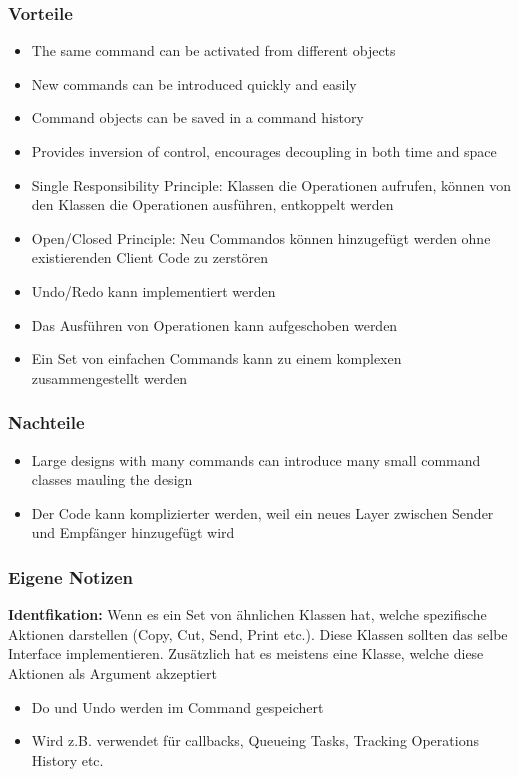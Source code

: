 \subsubsection{Vorteile}
\begin{itemize}[topsep=0pt]
    \itemsep -0.4em
    \item The same command can be activated from different objects
    \item New commands can be introduced quickly and easily
    \item Command objects can be saved in a command history
    \item Provides inversion of control, encourages decoupling in both time and space
    \item Single Responsibility Principle: Klassen die Operationen aufrufen, können von den Klassen die Operationen ausführen, entkoppelt werden
    \item Open/Closed Principle: Neu Commandos können hinzugefügt werden ohne existierenden Client Code zu zerstören
    \item Undo/Redo kann implementiert werden
    \item Das Ausführen von Operationen kann aufgeschoben werden
    \item Ein Set von einfachen Commands kann zu einem komplexen zusammengestellt werden
\end{itemize}
\subsubsection{Nachteile}
\begin{itemize}[topsep=0pt]
    \itemsep -0.4em
    \item Large designs with many commands can introduce many small command classes mauling the design
    \item Der Code kann komplizierter werden, weil ein neues Layer zwischen Sender und Empfänger hinzugefügt wird
\end{itemize}
\subsubsection{Eigene Notizen}
\textbf{Identfikation:} Wenn es ein Set von ähnlichen Klassen hat, welche spezifische Aktionen darstellen (Copy, Cut, Send, Print etc.). Diese Klassen sollten das selbe Interface implementieren. Zusätzlich hat es meistens eine Klasse, welche diese Aktionen als Argument akzeptiert
\begin{itemize}[topsep=0pt]
    \itemsep -0.4em
    \item Do und Undo werden im Command gespeichert
    \item Wird z.B. verwendet für callbacks, Queueing Tasks, Tracking Operations History etc.
\end{itemize}

